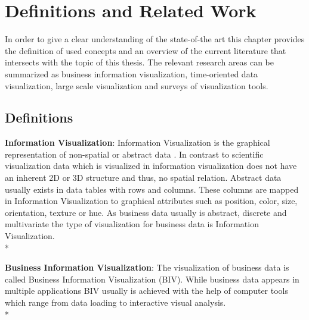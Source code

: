 \chapter{Definitions and Related Work}
\label{concepts}
In order to give a clear understanding of the state-of-the art this chapter provides the definition of used concepts and an overview of the current literature that intersects with the topic of this thesis. The relevant research areas can be summarized as business information visualization,  time-oriented data visualization, large scale visualization and surveys of visualization tools. 

\section{Definitions}
\textbf{Information Visualization}:
Information Visualization is the graphical representation of non-spatial or abstract data  \cite{Keim2006}. In contrast to scientific visualization data which is visualized in information visualization does not have an inherent 2D or 3D structure  \cite{Shneiderman2008} and thus, no spatial relation. Abstract data usually exists in data tables with rows and columns. These columns are mapped in Information Visualization to graphical attributes such as position, color, size, orientation, texture or hue. 
As business data usually is abstract, discrete and multivariate  \cite{Tegarden1999} the type of visualization for business data is Information Visualization.\\*

\textbf{Business Information Visualization}\label{BIV}:
The visualization of business data is called Business Information Visualization (BIV). While business data appears in multiple applications \gls{BIV} usually is achieved with the help of computer tools which range from data loading to interactive visual analysis. \\*

